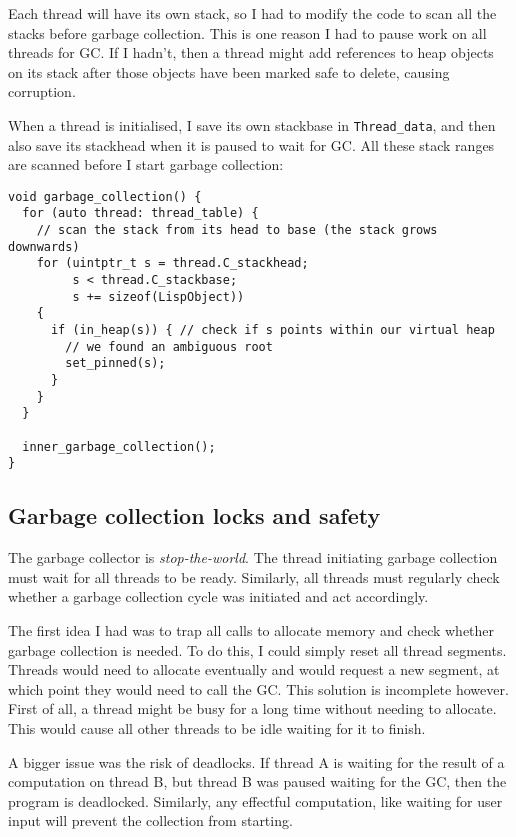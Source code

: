 Each thread will have its own stack, so I had to modify the code to scan all the stacks before garbage
collection. This is one reason I had to pause work on all threads for GC. If I hadn't, then a thread might
add references to heap objects on its stack after those objects have been marked safe to delete, causing corruption.

When a thread is initialised, I save its own stackbase in \texttt{Thread\_data}, and then also save its stackhead
when it is paused to wait for GC. All these stack ranges are scanned before I start garbage collection:

\begin{verbatim}
void garbage_collection() {
  for (auto thread: thread_table) {
    // scan the stack from its head to base (the stack grows downwards)
    for (uintptr_t s = thread.C_stackhead;
         s < thread.C_stackbase;
         s += sizeof(LispObject))
    {
      if (in_heap(s)) { // check if s points within our virtual heap
        // we found an ambiguous root
        set_pinned(s);
      }
    }
  }

  inner_garbage_collection();
}
\end{verbatim}

\subsection{Garbage collection locks and safety}
\label{sec:gclock}
The garbage collector is \emph{stop-the-world}. The thread initiating garbage collection must wait for all
threads to be ready. Similarly, all threads must regularly check whether a garbage collection cycle was
initiated and act accordingly.

The first idea I had was to trap all calls to allocate memory and check whether garbage collection is needed.
To do this, I could simply reset all thread segments. Threads would need to allocate eventually and
would request a new segment, at which point they would need to call the GC. This solution is incomplete however.
First of all, a thread might be busy for a long time without needing to allocate. This would cause all other
threads to be idle waiting for it to finish.


A bigger issue was the risk of deadlocks. If thread A is waiting for the result of a computation on thread B,
but thread B was paused waiting for the GC, then the program is deadlocked. Similarly, any effectful computation,
like waiting for user input will prevent the collection from starting.

